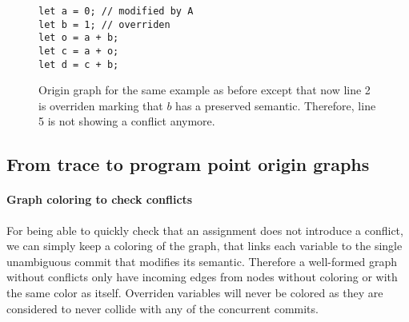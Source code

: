 \documentclass[a4paper,10pt]{article}
\begin{document}
\begin{figure}[ht]
\begin{minipage}{.5\textwidth}
\begin{lstlisting}
let a = 0; // modified by A
let b = 1; // overriden
let o = a + b;
let c = a + o;
let d = c + b;
\end{lstlisting}
\end{minipage}\hfill
\begin{minipage}{.45\textwidth}
\centering{}
\end{minipage}
\caption{Origin graph for the same example as before except that now line 2 is
overriden marking that $b$ has a preserved semantic. Therefore, line 5 is not showing a conflict anymore.}
\end{figure}

\subsection{From trace to program point origin graphs}
\paragraph{Graph coloring to check conflicts} For being able to quickly check that an assignment does not introduce a conflict, we can simply keep a coloring of the graph, that links each variable to the single unambiguous commit that modifies its semantic.
Therefore a well-formed graph without conflicts only have incoming edges from nodes without coloring or with the same color as itself.
Overriden variables will never be colored as they are considered to never collide with any of the concurrent commits.
\end{document}
